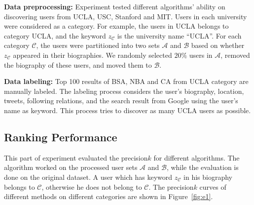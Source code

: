 \documentclass{article}
\begin{document}
\textbf{Data preprocessing:} Experiment tested different algorithms' ability on discovering users from UCLA, USC, Stanford and MIT. Users in each university were considered as a category. For example, the users in UCLA belongs to category UCLA, and the keyword $z_{\mathcal{C}}$ is the university name ``UCLA''. For each category $\mathcal{C}$, the users were partitioned into two sets $\mathcal{A}$ and $\mathcal{B}$ based on whether $z_{\mathcal{C}}$ appeared in their biographies. We randomly selected $20\%$ users in $\mathcal{A}$, removed the biography of these users, and moved them to $\mathcal{B}$.

\textbf{Data labeling:} Top 100 results of BSA, NBA and CA from UCLA category are manually labeled. The labeling process considers the user's biography, location, tweets, following relations, and the search result from Google using the user's name as keyword. This process tries to discover as many UCLA users as possible.

\subsection{Ranking Performance}
This part of experiment evaluated the precision\at$k$ for different algorithms. The algorithm worked on the processed user sets $\mathcal{A}$ and $\mathcal{B}$, while the evaluation is done on the original dataset. A user which has keyword $z_{\mathcal{C}}$ in his biography belongs to $\mathcal{C}$, otherwise he does not belong to $\mathcal{C}$.
The precision\at$k$ curves of different methods on different categories are shown in Figure~\ref{fig:e1}.
\end{document}
